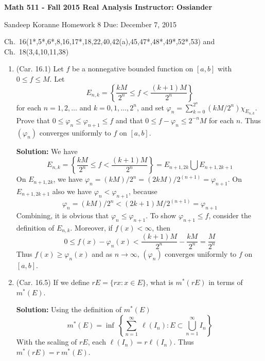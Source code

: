 \documentclass{article}
\def\ge{\geqslant}
\def\le{\leqslant}
\def\phi{\varphi}
\def\to{\rightarrow}
\begin{document}
\thispagestyle{empty}

\textbf{Math 511 - Fall 2015 \hfill Real Analysis  \hfill Instructor: Ossiander}

\hrulefill 
\medskip 

 {Sandeep Koranne \hfill  Homework 8 \hfill Due: December 7, 2015}
 \begin{center}
Ch.~16(1*,5*,6*,8,16,17*,18,22,40,42(a),45,47*,48*,49*,52*,53) and
Ch.~18(3,4,10,11,38)
 \end{center}
\medskip

\begin{enumerate}


\item (Car. 16.1) Let $f$ be a nonnegative bounded function
on $[a,b]$ with $0 \le f\le M$. Let
\[
E_{n,k} = \left\{\frac{kM}{2^n} \le f < \frac{(k+1)M}{2^n} \right\}
\]
for each $n=1,2,\ldots$ and $k=0,1,\ldots,2^n$, and set
$\phi_n = \sum_{k=0}^{2^n} (kM/2^n) \chi_{E_{n,k}}$. Prove that
$0 \le \phi_n \le \phi_{n+1} \le f$ and that $0 \le f-\phi_n \le 2^{-n}M$
for each $n$. Thus $(\phi_n)$ converges uniformly to $f$ on $[a,b]$.

\textbf{Solution:} We have
\[
E_{n,k} = \left\{\frac{kM}{2^n} \le f < \frac{(k+1)M}{2^n} \right\} = E_{n+1,2k} \bigcup E_{n+1,2k+1}
\]
On $E_{n+1,2k}$, we have $\phi_n=(kM)/2^n = (2kM)/2^(n+1) = \phi_{n+1}$.
On $E_{n+1,2k+1}$ also we have $\phi_n<\phi_{n+1}$, because
\[
\phi_n = (kM)/2^n < (2k+1)M/2^{(n+1)} = \phi_{n+1}
\]
Combining,
it is obvious that
$\phi_n \le \phi_{n+1}$. To show $\phi_{n+1}\le f$, consider the
definition of $E_{n,k}$. Moreover, if $f(x) < \infty$, then
\[
0 \le f(x) -\phi_n(x) < \frac{(k+1)M}{2^n} - \frac{kM}{2^n} = \frac{M}{2^n}
\]
Thus $f(x) \ge \phi_n(x)$ and as $n\to\infty$, 
$(\phi_n)$ converges uniformly to $f$ on $[a,b]$.

\item (Car. 16.5) If we define $rE = \{ rx: x \in E\}$, what is
$m^*(rE)$ in terms of $m^*(E)$.

\textbf{Solution:} Using the definition of $m^*(E)$
\[
m^*(E) = \inf\ \left\{ \sum_{n=1}^\infty \ \ell(I_n) : E \subset \bigcup_{n=1}^\infty I_n \right\}
\]
With the scaling of $rE$, each $\ell(I_n)=r\ell(I_n)$. Thus
$m^*(rE)=r\ m^*(E)$.


\end{enumerate}
\end{document}
